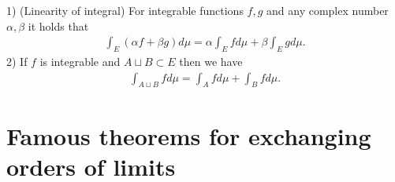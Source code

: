 \documentclass[openany, a4paper, oneside]{jsbook}
\begin{document}
\begin{thm}
 1) \textup{(Linearity of integral)} For integrable functions $f, g$ and any complex number $\alpha, \beta$ it holds that
    \begin{align}
     \int_E (\alpha f + \beta g) d \mu
     =
     \alpha \int_E f d\mu + \beta \int_E g d\mu.
    \end{align}
 2) If $f$ is integrable and $A \sqcup B \subset E$ then we have
    \begin{align}
     \int_{A \sqcup B} f d\mu
     =
     \int_A f d \mu + \int_B f d\mu.
    \end{align}
\end{thm}
\section{Famous theorems for exchanging orders of limits}
\end{document}

